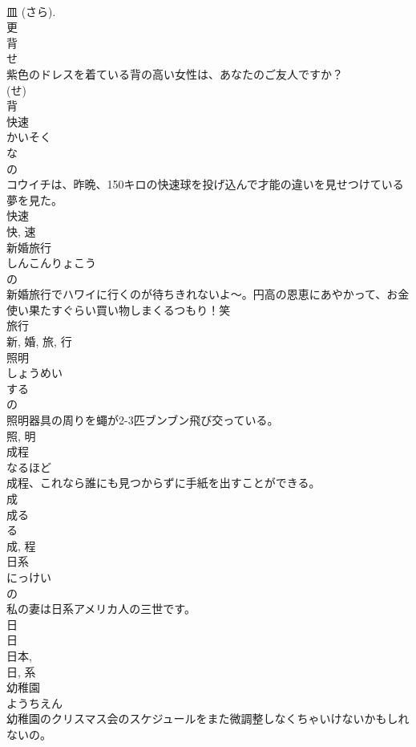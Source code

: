 \documentclass[8pt]{extreport}
\begin{document}
\begin{CJK}{UTF8}{min}
\\	皿 (さら). 
\\	更	
\\	背	
\\	せ	
\\	紫色のドレスを着ている背の高い女性は、あなたのご友人ですか？	
\\	(せ) 
\\	背	
\\	快速	
\\	かいそく	
\\	な 
\\	の 
\\	コウイチは、昨晩、150キロの快速球を投げ込んで才能の違いを見せつけている夢を見た。	
\\	快速 
\\	快, 速	
\\	新婚旅行	
\\	しんこんりょこう	
\\	の 
\\	新婚旅行でハワイに行くのが待ちきれないよ〜。円高の恩恵にあやかって、お金使い果たすぐらい買い物しまくるつもり！笑	
\\	旅行 
\\	新, 婚, 旅, 行	
\\	照明	
\\	しょうめい	
\\	する 
\\	の 
\\	照明器具の周りを蠅が2-3匹ブンブン飛び交っている。	
\\	照, 明	
\\	成程	
\\	なるほど	
\\	成程、これなら誰にも見つからずに手紙を出すことができる。	
\\	成 
\\	成る 
\\	る 
\\	成, 程	
\\	日系	
\\	にっけい	
\\	の 
\\	私の妻は日系アメリカ人の三世です。	
\\	日 
\\	日 
\\	日本, 
\\	日, 系	
\\	幼稚園	
\\	ようちえん	
\\	幼稚園のクリスマス会のスケジュールをまた微調整しなくちゃいけないかもしれないの。	

\end{CJK}
\end{document}
